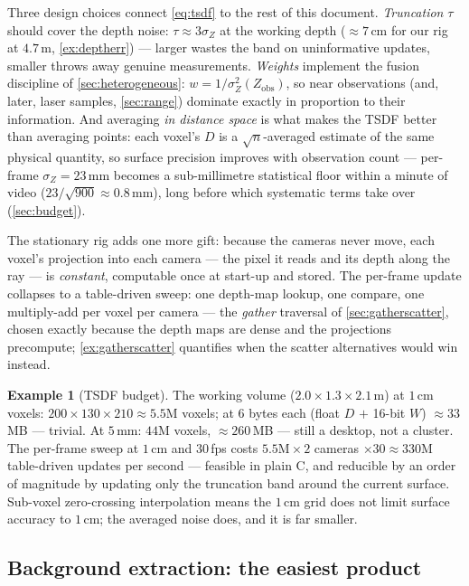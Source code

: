 \documentclass[11pt]{article}
\theoremstyle{definition}
\newtheorem{example}{Example}
\begin{document}
Three design choices connect \eqref{eq:tsdf} to the rest of this
document. \emph{Truncation} $\tau$ should cover the depth noise:
$\tau \approx 3\sigma_Z$ at the working depth ($\approx7$\,cm for our
rig at $4.7$\,m, \autoref{ex:deptherr}) --- larger wastes the band on
uninformative updates, smaller throws away genuine measurements.
\emph{Weights} implement the fusion discipline of
\autoref{sec:heterogeneous}: $w = 1/\sigma_Z^2(Z_{\text{obs}})$, so
near observations (and, later, laser samples, \autoref{sec:range})
dominate exactly in proportion to their information. And averaging
\emph{in distance space} is what makes the TSDF better than averaging
points: each voxel's $D$ is a $\sqrt n$-averaged estimate of the same
physical quantity, so surface precision improves with observation count
--- per-frame $\sigma_Z = 23$\,mm becomes a sub-millimetre statistical
floor within a minute of video ($23/\sqrt{900}\approx0.8$\,mm),
long before which systematic terms take over (\autoref{sec:budget}).

The stationary rig adds one more gift: because the cameras never move,
each voxel's projection into each camera --- the pixel it reads and its
depth along the ray --- is \emph{constant}, computable once at start-up
and stored. The per-frame update collapses to a table-driven sweep: one
depth-map lookup, one compare, one multiply-add per voxel per camera ---
the \emph{gather} traversal of \autoref{sec:gatherscatter}, chosen
exactly because the depth maps are dense and the projections precompute;
\autoref{ex:gatherscatter} quantifies when the scatter alternatives
would win instead.

\begin{example}[TSDF budget]
\label{ex:tsdf}
The working volume ($2.0\times1.3\times2.1$\,m) at $1$\,cm voxels:
$200\times130\times210 \approx 5.5$M voxels; at 6 bytes each (float $D$
$+$ 16-bit $W$) $\approx 33$\,MB --- trivial. At $5$\,mm:
$44$M voxels, $\approx260$\,MB --- still a desktop, not a cluster. The
per-frame sweep at $1$\,cm and $30$\,fps costs
$5.5\text{M}\times2$ cameras $\times30 \approx 330$M table-driven
updates per second --- feasible in plain C, and reducible by an order
of magnitude by updating only the truncation band around the current
surface. Sub-voxel zero-crossing interpolation means the $1$\,cm grid
does not limit surface accuracy to $1$\,cm; the averaged noise does,
and it is far smaller.
\end{example}

\subsection{Background extraction: the easiest product}
\label{sec:background}
\end{document}
